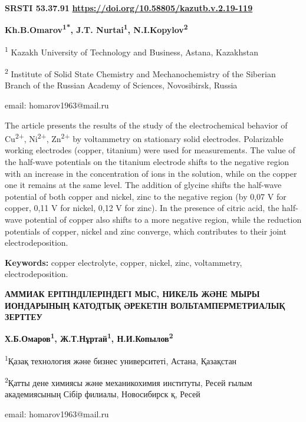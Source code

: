 \clearpage
{\bfseries SRSTI 53.37.91}\hfill
\hfill {\bfseries \href{https://doi.org/10.58805/kazutb.v.2.19-119}{https://doi.org/10.58805/kazutb.v.2.19-119}}



\begin{center}
{\bfseries Kh.B.Omarov\textsuperscript{1*}, J.T. Nurtai\textsuperscript{1},
N.I.Kopylov\textsuperscript{2}}

\textsuperscript{1} Kazakh University of Technology and Business,
Astana, Kazakhstan

\textsuperscript{2} Institute of Solid State Chemistry and
Mechanochemistry of the Siberian Branch of the Russian Academy of
Sciences, Novosibirsk, Russia

email: homarov1963@mail.ru
\end{center}

The article presents the results of the study of the electrochemical
behavior of Cu\textsuperscript{2+}, Ni\textsuperscript{2+},
Zn\textsuperscript{2+} by voltammetry on stationary solid electrodes.
Polarizable working electrodes (copper, titanium) were used for
measurements. The value of the half-wave potentials on the titanium
electrode shifts to the negative region with an increase in the
concentration of ions in the solution, while on the copper one it
remains at the same level. The addition of glycine shifts the half-wave
potential of both copper and nickel, zinc to the negative region (by
0,07 V for copper, 0,11 V for nickel, 0,12 V for zinc). In the presence
of citric acid, the half-wave potential of copper also shifts to a more
negative region, while the reduction potentials of copper, nickel and
zinc converge, which contributes to their joint electrodeposition.

{\bfseries Keywords:} copper electrolyte, copper, nickel, zinc,
voltammetry, electrodeposition.

\begin{center}
{\large\bfseries АММИАК ЕРІТІНДІЛЕРІНДЕГІ МЫС, НИКЕЛЬ ЖӘНЕ МЫРЫ ИОНДАРЫНЫҢ КАТОДТЫҚ ӘРЕКЕТІН ВОЛЬТАМПЕРМЕТРИАЛЫҚ ЗЕРТТЕУ}

\vspace{1em}
{\bfseries Х.Б.Омаров\textsuperscript{1}, Ж.Т.Нұртай\textsuperscript{1},
Н.И.Копылов\textsuperscript{2}}

\textsuperscript{1}Қазақ технология және бизнес университеті, Астана,
Қазақстан

\textsuperscript{2}Қатты дене химиясы және механикохимия институты,
Ресей ғылым академиясының Сібір филиалы, Новосибирск қ, Ресей

email: homarov1963@mail.ru
\end{center}

